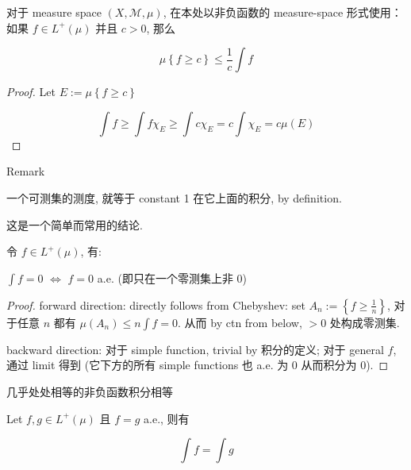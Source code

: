 \begin{lemma}{}

对于 measure space \((X,\mathcal{M},\mu)\),  在本处以非负函数的 measure-space 形式使用：如果 \(f \in L^{+}(\mu)\) 并且 \(c > 0\), 那么

\[\mu\left\{ {f \geq c} \right\} \leq \frac{1}{c}\int f\]

\end{lemma}

\begin{proof}

Let \(E := \mu\left\{ {f \geq c} \right\}\)

\[\int f \geq \int f\chi_{E} \geq \int c\chi_{E} = c\int\chi_{E} = c\mu(E)\]

\end{proof}

\begin{qlremark}{Remark}

一个可测集的测度, 就等于 constant 1 在它上面的积分, by definition.

这是一个简单而常用的结论.

\end{qlremark}

\begin{proposition}{}

令 \(f \in L^{+}(\mu)\), 有:

\(\int f = 0\) \(\Leftrightarrow\) \(f = 0\) a.e. (即只在一个零测集上非 0)

\end{proposition}

\begin{proof}

forward direction: directly follows from Chebyshev: set \(A_{n} := \left\{ {f \geq \frac{1}{n}} \right\}\), 对于任意 \(n\) 都有 \(\mu(A_{n}) \leq n\int f = 0\). 从而 by ctn from below, \(> 0\) 处构成零测集.

backward direction: 对于 simple function, trivial by 积分的定义; 对于 general \(f\), 通过 limit 得到 (它下方的所有 simple functions 也 a.e. 为 0 从而积分为 0).

\end{proof}

\begin{corollary}{几乎处处相等的非负函数积分相等}

Let \(f,g \in L^{+}(\mu)\) 且 \(f = g\) a.e., 则有

\[\int f = \int g\]

\end{corollary}

